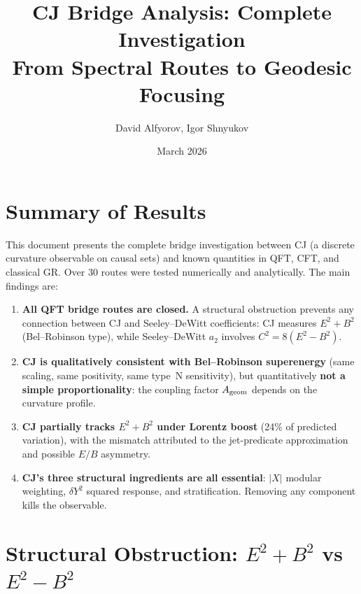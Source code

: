 \documentclass[11pt,a4paper]{article}
\title{CJ Bridge Analysis: Complete Investigation\\
{\large From Spectral Routes to Geodesic Focusing}}
\author{David Alfyorov, Igor Shnyukov}
\date{March 2026}
\begin{document}
\maketitle
\tableofcontents

\section{Summary of Results}

This document presents the complete bridge investigation between CJ (a discrete curvature observable on causal sets) and known quantities in QFT, CFT, and classical GR. Over 30 routes were tested numerically and analytically. The main findings are:

\begin{enumerate}
\item \textbf{All QFT bridge routes are closed.} A structural obstruction prevents any connection between CJ and Seeley--DeWitt coefficients: CJ measures $E^2+B^2$ (Bel--Robinson type), while Seeley--DeWitt $a_2$ involves $C^2 = 8(E^2-B^2)$.

\item \textbf{CJ is qualitatively consistent with Bel--Robinson superenergy} (same scaling, same positivity, same type~N sensitivity), but quantitatively \textbf{not a simple proportionality}: the coupling factor $A_{\rm geom}$ depends on the curvature profile.

\item \textbf{CJ partially tracks $E^2+B^2$ under Lorentz boost} (24\% of predicted variation), with the mismatch attributed to the jet-predicate approximation and possible $E/B$ asymmetry.

\item \textbf{CJ's three structural ingredients are all essential}: $|X|$ modular weighting, $\delta Y^2$ squared response, and stratification. Removing any component kills the observable.
\end{enumerate}

\section{Structural Obstruction: $E^2+B^2$ vs $E^2-B^2$}
\end{document}
